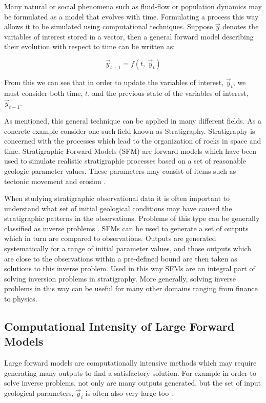 \documentclass[12pt]{article}
\begin{document}
Many natural or social phenomena such as fluid-flow or population dynamics may be formulated as a model that evolves with time. Formulating a process this way allows it to be simulated using computational techniques. Suppose $\vec y$ denotes the variables of interest stored in a vector, then a general forward model describing their evolution with respect to time can be written as:

\begin{center}
	\begin{equation}
	\vec y_{t+1} = f(t, ~\vec y_t)
	\end{equation}
\end{center}

From this we can see that in order to update the variables of interest, $\vec y_t$, we must consider both time, $t$, and the previous state of the variables of interest, $\vec y_{t-1}$.

As mentioned, this general technique can be applied in many different fields. As a concrete example consider one such field known as Stratigraphy. Stratigraphy is concerned with the processes which lead to the organization of rocks in space and time. Stratigraphic Forward Models (SFM) are forward models which have been used to simulate realistic stratigraphic processes based on a set of reasonable geologic parameter values. These parameters may consist of items such as tectonic movement and erosion \autocite{10.2110/pec.99.62.0069}.

When studying stratigraphic observational data it is often important to understand what set of initial geological conditions may have caused the stratigraphic patterns in the observations. Problems of this type can be generally classified as inverse problems \autocite{10.1260/0144598011492363}. SFMs can be used to generate a set of outputs which in turn are compared to observations. Outputs are generated systematically for a range of initial parameter values, and those outputs which are close to the observations within a pre-defined bound are then taken as solutions to this inverse problem. Used in this way SFMs are an integral part of solving inversion problems in stratigraphy. More generally, solving inverse problems in this way can be useful for many other domains ranging from finance to physics.

\subsection{Computational Intensity of Large Forward Models}
Large forward models are computationally intensive methods which may require generating many outputs to find a satisfactory solution. For example in order to solve inverse problems, not only are many outputs generated, but the set of input geological parameters, $\vec y_i$ is often also very large too \autocite{10.1260/0144598011492363}.
\end{document}
